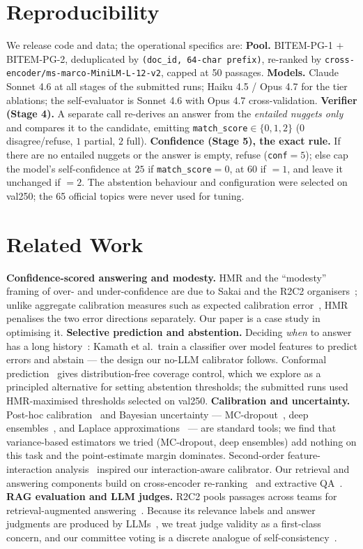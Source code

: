 \documentclass[sigconf,nonacm]{acmart}
\newcommand{\HMR}{\textsc{HMR}}
\begin{document}
\section{Reproducibility}
\label{sec:repro}
We release code and data; the operational specifics are:
\textbf{Pool.} BITEM-PG-1 $+$ BITEM-PG-2, deduplicated by \texttt{(doc\_id, 64-char prefix)},
re-ranked by \texttt{cross-encoder/ms-marco-MiniLM-L-12-v2}, capped at 50 passages.
\textbf{Models.} Claude Sonnet 4.6 at all stages of the submitted runs; Haiku 4.5 / Opus 4.7
for the tier ablations; the self-evaluator is Sonnet 4.6 with Opus 4.7 cross-validation.
\textbf{Verifier (Stage 4).} A separate call re-derives an answer from the \emph{entailed
nuggets only} and compares it to the candidate, emitting \texttt{match\_score}$\in\{0,1,2\}$
($0$ disagree/refuse, $1$ partial, $2$ full).
\textbf{Confidence (Stage 5), the exact rule.} If there are no entailed nuggets or the answer
is empty, refuse (\texttt{conf}$=5$); else cap the model's self-confidence at $25$ if
\texttt{match\_score}$=0$, at $60$ if $=1$, and leave it unchanged if $=2$. The abstention
behaviour and configuration were selected on val250; the 65 official topics were never used
for tuning.

\section{Related Work}
\label{sec:related}
\textbf{Confidence-scored answering and modesty.} \HMR{} and the ``modesty'' framing of
over- and under-confidence are due to Sakai and the R2C2 organisers~\cite{sakai-hmr,modesty,brevrag};
unlike aggregate calibration measures such as expected calibration error~\cite{guo2017},
\HMR{} penalises the two error directions separately. Our paper is a case study in optimising
it.
\textbf{Selective prediction and abstention.} Deciding \emph{when} to answer has a long
history~\cite{kamath2020}: Kamath et al.\ train a classifier over model features to predict
errors and abstain --- the design our no-LLM calibrator follows. Conformal
prediction~\cite{conformal2023,mohri2024} gives distribution-free coverage control, which we
explore as a principled alternative for setting abstention thresholds; the submitted runs
used \HMR-maximised thresholds selected on val250.
\textbf{Calibration and uncertainty.} Post-hoc calibration~\cite{guo2017} and Bayesian
uncertainty --- MC-dropout~\cite{gal2016}, deep ensembles~\cite{ensembles2017}, and Laplace
approximations~\cite{laplace2021} --- are standard tools; we find that variance-based
estimators we tried (MC-dropout, deep ensembles) add nothing on this task and the
point-estimate margin dominates. Second-order
feature-interaction analysis~\cite{smoothhess,inthessians} inspired our interaction-aware
calibrator. Our retrieval and answering components build on cross-encoder
re-ranking~\cite{monobert} and extractive QA~\cite{squad2,roberta,electra,minilm}.
\textbf{RAG evaluation and LLM judges.} R2C2 pools passages across teams for retrieval-augmented
answering~\cite{rag}. Because its relevance labels and answer judgments are produced by
LLMs~\cite{llmjudge}, we treat judge validity as a first-class concern, and our committee
voting is a discrete analogue of self-consistency~\cite{selfconsistency}.
\end{document}

